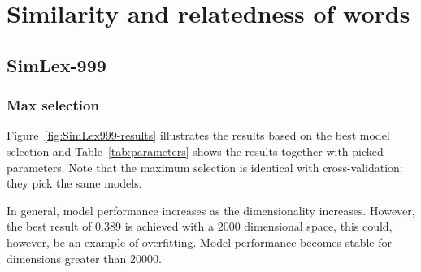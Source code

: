



\chapter{Similarity and relatedness of words}
\label{sec:lexical}

\section{SimLex-999}
\label{sec:simlex-999}

\subsection{Max selection}
\label{sec:max-selection-simlex}



Figure~\ref{fig:SimLex999-results} illustrates the results based on the best model selection and Table~\ref{tab:parameters} shows the results together with picked parameters. Note that the maximum selection is identical with cross-validation: they pick the same models.

In general, model performance increases as the dimensionality increases. However, the best result of 0.389 is achieved with a 2000 dimensional space, this could, however, be an example of overfitting. Model performance becomes stable for dimensions greater than 20000.

